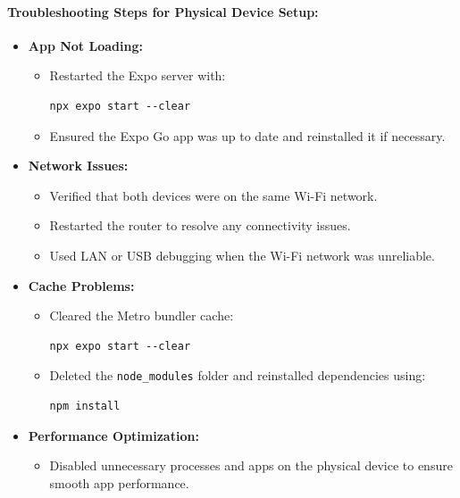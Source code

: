 \documentclass[12pt]{article}
\begin{document}
\paragraph{Troubleshooting Steps for Physical Device Setup:}
\begin{itemize}
    \item \textbf{App Not Loading:}
    \begin{itemize}
        \item Restarted the Expo server with:
        \begin{verbatim}
npx expo start --clear
        \end{verbatim}
        \item Ensured the Expo Go app was up to date and reinstalled it if necessary.
    \end{itemize}
    \item \textbf{Network Issues:}
    \begin{itemize}
        \item Verified that both devices were on the same Wi-Fi network.
        \item Restarted the router to resolve any connectivity issues.
        \item Used LAN or USB debugging when the Wi-Fi network was unreliable.
    \end{itemize}
    \item \textbf{Cache Problems:}
    \begin{itemize}
        \item Cleared the Metro bundler cache:
        \begin{verbatim}
npx expo start --clear
        \end{verbatim}
        \item Deleted the \texttt{node\_modules} folder and reinstalled dependencies using:
        \begin{verbatim}
npm install
        \end{verbatim}
    \end{itemize}
    \item \textbf{Performance Optimization:}
    \begin{itemize}
        \item Disabled unnecessary processes and apps on the physical device to ensure smooth app performance.
    \end{itemize}
\end{itemize}
\end{document}
